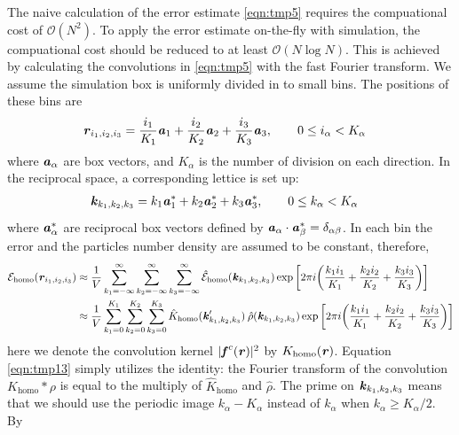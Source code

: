 \documentclass[aps,pre,preprint]{revtex4}
\renewcommand{\v}[1]{\textbf{\textit{#1}}}
\begin{document}
The naive calculation of the error estimate \eqref{eqn:tmp5} requires
the compuational cost of $\mathcal O(N^2)$. To apply the error
estimate on-the-fly with simulation, the compuational cost should be
reduced to at least $\mathcal O(N\log N)$.  This is achieved by
calculating the convolutions in \eqref{eqn:tmp5} with the fast Fourier
transform. We assume the simulation box is uniformly divided in to
small bins.  The positions of these bins are
\begin{align}
  \v r_{i_1, i_2, i_3} & =
  \frac{i_1}{K_1}\v a_1 + 
  \frac{i_2}{K_2}\v a_2 + 
  \frac{i_3}{K_3}\v a_3,\qquad 0\leq i_\alpha< K_\alpha
\end{align}
where $\v a_\alpha$ are box vectors, and $K_\alpha$ is the number of
division on each direction. In the reciprocal space, a corresponding
lettice is set up:
\begin{align}
  \v k_{k_1, k_2, k_3} & =
  k_1\v a_1^\ast +
  k_2\v a_2^\ast +
  k_3\v a_3^\ast, \qquad 0\leq k_\alpha<K_\alpha
\end{align}
where $\v a_\alpha^\ast$ are reciprocal box vectors defined by $\v
a_\alpha\cdot\v a_\beta^\ast = \delta_{\alpha\beta}$.  In each bin the
error and the particles number density are assumed to be constant,
therefore,
\begin{align}\nonumber
  \mathcal E_{\textrm{homo}}(\v r_{i_1,i_2,i_3})
  & \approx
  \frac1V\sum_{k_1=-\infty}^\infty\sum_{k_2=-\infty}^\infty\sum_{k_3=-\infty}^\infty
  \hat{\mathcal E}_{\textrm{homo}}(\v k_{k_1,k_2,k_3})
  \exp\bigg[
  2\pi i\bigg(
  \frac{k_1i_1}{K_1} + \frac{k_2i_2}{K_2} + \frac{k_3i_3}{K_3}
  \bigg)
  \bigg] \\\label{eqn:tmp13}
  & \approx
  \frac1V\sum_{k_1=0}^{K_1}\sum_{k_2=0}^{K_2}\sum_{k_3=0}^{K_3}
  \hat{K}_{\textrm{homo}}(\v k'_{k_1,k_2,k_3})\:
  \hat{\rho}(\v k_{k_1,k_2,k_3})
  \exp\bigg[
  2\pi i\bigg(
  \frac{k_1i_1}{K_1} + \frac{k_2i_2}{K_2} + \frac{k_3i_3}{K_3}
  \bigg)
  \bigg]   
\end{align}
here we denote the convolution kernel $\vert\v f^c(\v r)\vert^2$ by
$K_{\textrm{homo}}(\v r)$.  Equation \eqref{eqn:tmp13} simply utilizes
the identity: the Fourier transform of the convolution
$K_{\textrm{homo}}\ast\rho$ is equal to the multiply of
$\hat{K}_{\textrm{homo}}$ and $\hat\rho$.  The prime on $\v
k_{k_1,k_2,k_3}$ means that we should use the periodic image $k_\alpha
- K_\alpha$ instead of $k_\alpha$ when $k_\alpha \geq K_\alpha/2$. By
\end{document}
